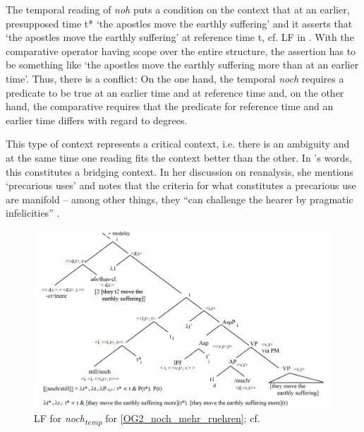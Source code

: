 \documentclass[output=paper,
modfonts
]{langscibook}
\begin{document}
The temporal reading of \textit{noh} puts a condition on the context that at an earlier, presupposed time t* `the apostles move the earthly suffering' and it asserts that `the apostles move the earthly suffering' at reference time t, cf. LF in  \citep[cf. also][]{beck2016a_sub}. With the comparative operator having scope over the entire structure, the assertion has to be something like `the apostles move the earthly suffering more than at an earlier time'. Thus, there is a conflict: On the one hand, the temporal \textit{noch} requires a predicate to be true at an earlier time and at reference time and, on the other hand, the comparative requires that the predicate for reference time and an earlier time differs with regard to degrees.

This type of context represents a critical context, i.e. there is an ambiguity and at the same time one reading fits the context better than the other. In \citeauthor{Eckardt_2011}'s \citeyearpar{Eckardt_2011} words, this constitutes a bridging context. In her discussion on reanalysis, she mentions `precarious uses' and notes that the criteria for what constitutes a precarious use are manifold -- among other things, they ``can challenge the hearer by pragmatic infelicities'' \citep[44]{Eckardt_2011}.

\begin{figure}
\includegraphics[width=1\textwidth]{figures/LF1_temp_>_over_noch}
\caption{LF for \textit{noch\textsubscript{temp}} for \ref{OG2_noch_mehr_ruehren}; cf. \citep{beck2016a_sub}}
\label{fig:LF1_temp_>_over_noch}
\end{figure}
\end{document}

